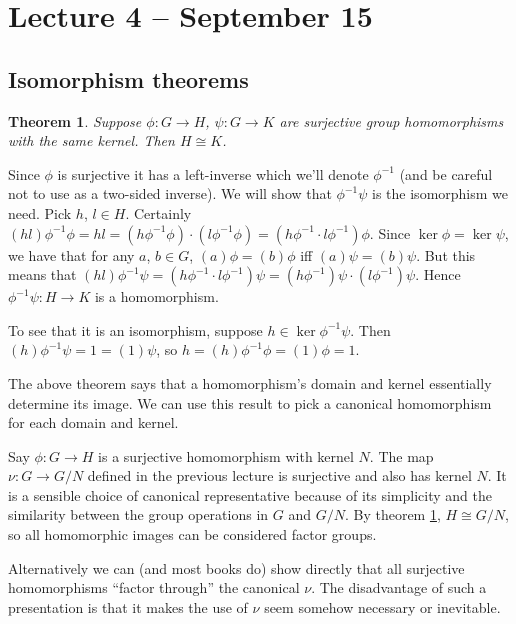 \documentclass[letterpaper]{article}
\newtheorem{theorem}{Theorem}[section]
\newcommand{\mdot}{{\cdot}}
\newenvironment{proof}[1][Proof]{\begin{trivlist}
\item[\hskip \labelsep {\bfseries #1}]}{\end{trivlist}}
\begin{document}
\section{Lecture 4 -- September 15}

\subsection{Isomorphism theorems}

\begin{theorem}
\label{firstiso}
Suppose $\phi \colon G \rightarrow H$, $\psi \colon G \rightarrow K$ are surjective group homomorphisms with the same kernel. Then $H \cong K$.
\end{theorem}
\begin{proof}
Since $\phi$ is surjective it has a left-inverse which we'll denote $\phi^{-1}$ (and be careful not to use as a two-sided inverse). We will show that $\phi^{-1}\psi$ is the isomorphism we need. Pick $h$, $l \in H$. Certainly $(hl)\phi^{-1}\phi = hl = (h\phi^{-1} \phi)\mdot(l\phi^{-1}\phi) = (h\phi^{-1}\mdot l\phi^{-1})\phi$. Since $\ker{\phi} = \ker{\psi}$, we have that for any $a$, $b \in G$, $(a)\phi = (b)\phi$ iff $(a)\psi = (b)\psi$. But this means that $(hl)\phi^{-1}\psi = (h\phi^{-1}\mdot l\phi^{-1})\psi = (h\phi^{-1})\psi\mdot (l\phi^{-1})\psi$. Hence $\phi^{-1}\psi \colon H \rightarrow K$ is a homomorphism.

To see that it is an isomorphism, suppose $h \in \ker{ \phi^{-1}\psi}$. Then $(h)\phi^{-1}\psi = 1 = (1)\psi$, so $h = (h)\phi^{-1}\phi = (1)\phi = 1$.
\end{proof}

The above theorem says that a homomorphism's domain and kernel essentially determine its image. We can use this result to pick a canonical homomorphism for each domain and kernel.

Say $\phi \colon G \rightarrow H$ is a surjective homomorphism with kernel $N$. The map $\nu \colon G \rightarrow G/N$ defined in the previous lecture is surjective and also has kernel $N$. It is a sensible choice of canonical representative because of its simplicity and the similarity between the group operations in $G$ and $G/N$. By theorem \ref{firstiso}, $H \cong G/N$, so all homomorphic images can be considered factor groups.

Alternatively we can (and most books do) show directly that all surjective homomorphisms ``factor through'' the canonical $\nu$. The disadvantage of such a presentation is that it makes the use of $\nu$ seem somehow necessary or inevitable.
\end{document}

